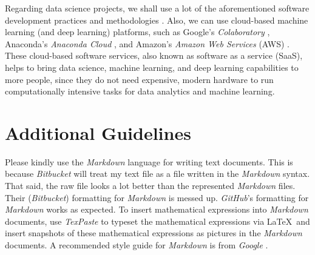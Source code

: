 \documentclass[letter,12pt]{article}
\begin{document}
Regarding data science projects, we shall use a lot of the aforementioned software development practices and methodologies \cite{Cady2017}. Also, we can use cloud-based machine learning (and deep learning) platforms, such as Google's {\it Colaboratory} \cite{GoogleColabStaff2019}, Anaconda's {\it Anaconda Cloud} \cite{AnacondaStaff2019}, and Amazon's {\it Amazon Web Services} (AWS) \cite{AmazonWebServicesStaff2019}. These cloud-based software services, also known as software as a service (SaaS), helps to bring data science, machine learning, and deep learning capabilities to more people, since they do not need expensive, modern hardware to run computationally intensive tasks for data analytics and machine learning.








\section{Additional Guidelines}
\label{sec:AdditionalGuidelines}

Please kindly use the {\it Markdown} language for writing text documents. This is because {\it Bitbucket} will treat my text file as a file written in the {\it Markdown} syntax. That said, the raw file looks a lot better than the represented {\it Markdown} files. Their ({\it Bitbucket}) formatting for {\it Markdown} is messed up. {\it GitHub}'s formatting for {\it Markdown} works as expected. To insert mathematical expressions into {\it Markdown} documents, use {\it TexPaste} \cite{Nguyen2013} to typeset the mathematical expressions via \LaTeX\ and insert snapshots of these mathematical expressions as pictures in the {\it Markdown} documents. A recommended style guide for {\it Markdown} is from {\it Google} \cite{Turakulov2018}. \\
\end{document}
